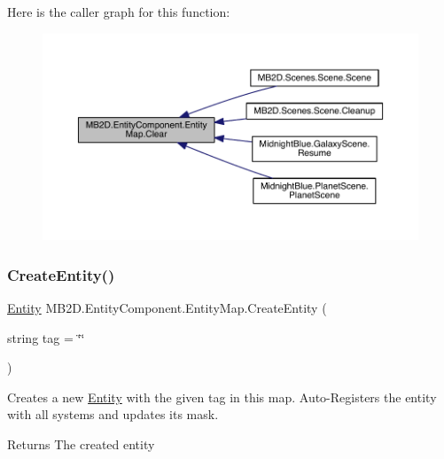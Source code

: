 Here is the caller graph for this function\+:
\nopagebreak
\begin{figure}[H]
\begin{center}
\leavevmode
\includegraphics[width=350pt]{class_m_b2_d_1_1_entity_component_1_1_entity_map_a079e8e957e7fbaa8de73e609ab646fe1_icgraph}
\end{center}
\end{figure}
\hypertarget{class_m_b2_d_1_1_entity_component_1_1_entity_map_a2461bfeb368018daadb2578c445f8fc2}{}\label{class_m_b2_d_1_1_entity_component_1_1_entity_map_a2461bfeb368018daadb2578c445f8fc2} 
\subsubsection{\texorpdfstring{Create\+Entity()}{CreateEntity()}}
{\footnotesize\ttfamily \hyperlink{class_m_b2_d_1_1_entity_component_1_1_entity}{Entity} M\+B2\+D.\+Entity\+Component.\+Entity\+Map.\+Create\+Entity (\begin{DoxyParamCaption}\item[{string}]{tag = {\ttfamily \char`\"{}\char`\"{}} }\end{DoxyParamCaption})\hspace{0.3cm}{\ttfamily [inline]}}



Creates a new \hyperlink{class_m_b2_d_1_1_entity_component_1_1_entity}{Entity} with the given tag in this map. Auto-\/\+Registers the entity with all systems and updates its mask. 

\begin{DoxyReturn}{Returns}
The created entity
\end{DoxyReturn}


